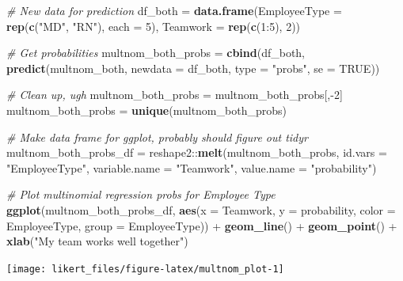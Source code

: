 \documentclass[]{book}
\newenvironment{Shaded}{\begin{snugshade}}{\end{snugshade}}
\newcommand{\KeywordTok}[1]{\textcolor[rgb]{0.13,0.29,0.53}{\textbf{{#1}}}}
\newcommand{\DataTypeTok}[1]{\textcolor[rgb]{0.13,0.29,0.53}{{#1}}}
\newcommand{\DecValTok}[1]{\textcolor[rgb]{0.00,0.00,0.81}{{#1}}}
\newcommand{\StringTok}[1]{\textcolor[rgb]{0.31,0.60,0.02}{{#1}}}
\newcommand{\CommentTok}[1]{\textcolor[rgb]{0.56,0.35,0.01}{\textit{{#1}}}}
\newcommand{\OtherTok}[1]{\textcolor[rgb]{0.56,0.35,0.01}{{#1}}}
\newcommand{\NormalTok}[1]{{#1}}
\begin{document}
\begin{Shaded}
\begin{Highlighting}[]
\CommentTok{# New data for prediction}
\NormalTok{df_both =}\StringTok{ }\KeywordTok{data.frame}\NormalTok{(}\DataTypeTok{EmployeeType =} \KeywordTok{rep}\NormalTok{(}\KeywordTok{c}\NormalTok{(}\StringTok{"MD"}\NormalTok{, }\StringTok{"RN"}\NormalTok{), }\DataTypeTok{each =} \DecValTok{5}\NormalTok{),  }
  \DataTypeTok{Teamwork =} \KeywordTok{rep}\NormalTok{(}\KeywordTok{c}\NormalTok{(}\DecValTok{1}\NormalTok{:}\DecValTok{5}\NormalTok{), }\DecValTok{2}\NormalTok{))}

\CommentTok{# Get probabilities}
\NormalTok{multnom_both_probs =}\StringTok{ }\KeywordTok{cbind}\NormalTok{(df_both, }\KeywordTok{predict}\NormalTok{(multnom_both, }
  \DataTypeTok{newdata =} \NormalTok{df_both, }\DataTypeTok{type =} \StringTok{"probs"}\NormalTok{, }\DataTypeTok{se =} \OtherTok{TRUE}\NormalTok{))}

\CommentTok{# Clean up, ugh}
\NormalTok{multnom_both_probs =}\StringTok{ }\NormalTok{multnom_both_probs[,-}\DecValTok{2}\NormalTok{]}
\NormalTok{multnom_both_probs =}\StringTok{ }\KeywordTok{unique}\NormalTok{(multnom_both_probs)}

\CommentTok{# Make data frame for ggplot, probably should figure out tidyr}
\NormalTok{multnom_both_probs_df =}\StringTok{ }\NormalTok{reshape2::}\KeywordTok{melt}\NormalTok{(multnom_both_probs, }
  \DataTypeTok{id.vars =} \StringTok{"EmployeeType"}\NormalTok{, }\DataTypeTok{variable.name =} \StringTok{"Teamwork"}\NormalTok{, }
  \DataTypeTok{value.name =} \StringTok{"probability"}\NormalTok{)}

\CommentTok{# Plot multinomial regression probs for Employee Type}
\KeywordTok{ggplot}\NormalTok{(multnom_both_probs_df, }\KeywordTok{aes}\NormalTok{(}\DataTypeTok{x =} \NormalTok{Teamwork, }\DataTypeTok{y =} \NormalTok{probability, }
    \DataTypeTok{color =} \NormalTok{EmployeeType, }\DataTypeTok{group =} \NormalTok{EmployeeType)) +}
\StringTok{  }\KeywordTok{geom_line}\NormalTok{() +}\StringTok{ }
\StringTok{  }\KeywordTok{geom_point}\NormalTok{() +}
\StringTok{  }\KeywordTok{xlab}\NormalTok{(}\StringTok{"My team works well together"}\NormalTok{)}
\end{Highlighting}
\end{Shaded}

\begin{center}\texttt{[image: likert\_files/figure-latex/multnom\_plot-1]} \end{center}
\end{document}
